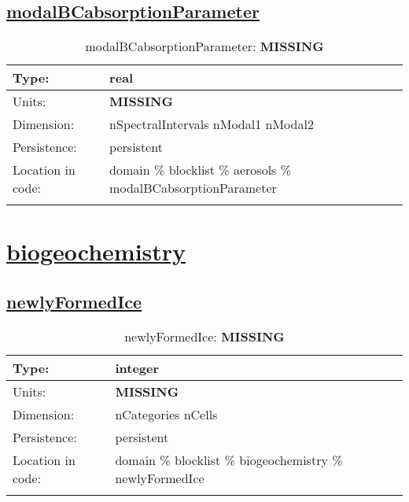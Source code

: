 \subsection[modalBCabsorptionParameter]{\hyperref[sec:var_tab_aerosols]{modalBCabsorptionParameter}}
\label{subsec:var_sec_aerosols_modalBCabsorptionParameter}
\begin{center}
\begin{longtable}{| p{2.0in} | p{4.0in} |}
        \hline 
        Type: & real \\
        \hline 
        Units: & {\bf \color{red} MISSING} \\
        \hline 
        Dimension: & nSpectralIntervals nModal1 nModal2 \\
        \hline 
        Persistence: & persistent \\
        \hline 
         Location in code: & domain \% blocklist \% aerosols \% modalBCabsorptionParameter \\
         \hline 
    \caption{modalBCabsorptionParameter: {\bf \color{red} MISSING}}
\end{longtable}
\end{center}
\section[biogeochemistry]{\hyperref[sec:var_tab_biogeochemistry]{biogeochemistry}}
\label{sec:var_sec_biogeochemistry}
\subsection[newlyFormedIce]{\hyperref[sec:var_tab_biogeochemistry]{newlyFormedIce}}
\label{subsec:var_sec_biogeochemistry_newlyFormedIce}
\begin{center}
\begin{longtable}{| p{2.0in} | p{4.0in} |}
        \hline 
        Type: & integer \\
        \hline 
        Units: & {\bf \color{red} MISSING} \\
        \hline 
        Dimension: & nCategories nCells \\
        \hline 
        Persistence: & persistent \\
        \hline 
         Location in code: & domain \% blocklist \% biogeochemistry \% newlyFormedIce \\
         \hline 
    \caption{newlyFormedIce: {\bf \color{red} MISSING}}
\end{longtable}
\end{center}
